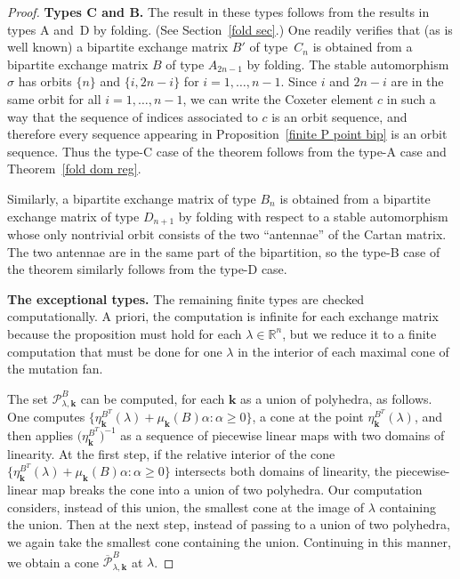 \documentclass{amsart}
\theoremstyle{definition}
\theoremstyle{remark}
\numberwithin{equation}{section}
\newcommand{\reals}{\mathbb R}
\newcommand{\set}[1]{{\lbrace #1 \rbrace}}
\newcommand{\sett}[1]{{\bigl\lbrace #1 \bigr\rbrace}}
\newcommand{\0}{{\mathbf{0}}}
\newcommand{\kk}{{\boldsymbol{k}}}
\renewcommand{\P}{\mathcal{P}}
\begin{document}
\begin{proof}
\medskip

\noindent
\textbf{Types C and B.} 
The result in these types follows from the results in types A and~D by folding.
(See Section~\ref{fold sec}.)
One readily verifies that (as is well known) a bipartite exchange matrix $B'$ of type~$C_n$ is obtained from a bipartite exchange matrix $B$ of type $A_{2n-1}$ by folding.
The stable automorphism $\sigma$ has orbits $\set{n}$ and $\set{i,2n-i}$ for $i=1,\ldots,n-1$.
Since $i$ and $2n-i$ are in the same orbit for all $i=1,\ldots,n-1$, we can write the Coxeter element $c$ in such a way that the sequence of indices associated to $c$ is an orbit sequence, and therefore every sequence appearing in Proposition~\ref{finite P point bip} is an orbit sequence.
Thus the type-C case of the theorem follows from the type-A case and Theorem~\ref{fold dom reg}.

Similarly, a bipartite exchange matrix of type $B_n$ is obtained from a bipartite exchange matrix of type $D_{n+1}$ by folding with respect to a stable automorphism whose only nontrivial orbit consists of the two ``antennae'' of the Cartan matrix.
The two antennae are in the same part of the bipartition, so the type-B case of the theorem similarly follows from the type-D case.

\medskip

\noindent
\textbf{The exceptional types.}
The remaining finite types are checked computationally.
A priori, the computation is infinite for each exchange matrix because the proposition must hold for each $\lambda\in\reals^n$, but we reduce it to a finite computation that must be done for one $\lambda$ in the interior of each maximal cone of the mutation fan.

The set $\P^B_{\lambda,\kk}$ can be computed, for each $\kk$ as a union of polyhedra, as follows.
One computes $\sett{\eta_\kk^{B^T}(\lambda)+\mu_\kk(B)\alpha:\alpha\ge0}$, a cone at the point $\eta_\kk^{B^T}(\lambda)$, and then applies $\bigl(\eta_{\kk}^{B^T}\bigr)^{-1}$ as a sequence of piecewise linear maps with two domains of linearity.
At the first step, if the relative interior of the cone $\sett{\eta_\kk^{B^T}(\lambda)+\mu_\kk(B)\alpha:\alpha\ge0}$ intersects both domains of linearity, the piecewise-linear map breaks the cone into a union of two polyhedra.
Our computation considers, instead of this union, the smallest cone at the image of $\lambda$ containing the union.
Then at the next step, instead of passing to a union of two polyhedra, we again take the smallest cone containing the union.  
Continuing in this manner, we obtain a cone $\overline{\P}^B_{\lambda,\kk}$ at $\lambda$.


\end{proof}
\end{document}
